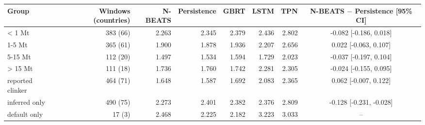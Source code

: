 \begin{tabular}{@{}lrrrrrrc@{}}
\toprule
Group & Windows (countries) & N-BEATS & Persistence & GBRT & LSTM & TPN & N-BEATS $-$ Persistence [95\% CI] \\
\midrule
< 1 Mt & 383 (66) & 2.263 & 2.345 & 2.379 & 2.436 & 2.802 & -0.082 [-0.186, 0.018] \\
1-5 Mt & 365 (61) & 1.900 & 1.878 & 1.936 & 2.207 & 2.656 & 0.022 [-0.063, 0.107] \\
5-15 Mt & 112 (20) & 1.497 & 1.534 & 1.594 & 1.729 & 2.023 & -0.037 [-0.197, 0.104] \\
> 15 Mt & 111 (18) & 1.736 & 1.760 & 1.742 & 2.281 & 2.305 & -0.024 [-0.155, 0.095] \\
\midrule
reported clinker & 464 (71) & 1.648 & 1.587 & 1.692 & 2.083 & 2.365 & 0.062 [-0.007, 0.122] \\
inferred only & 490 (75) & 2.273 & 2.401 & 2.382 & 2.376 & 2.809 & -0.128 [-0.231, -0.028] \\
default only & 17 (3) & 2.468 & 2.225 & 2.182 & 3.223 & 3.033 & -- \\
\bottomrule
\end{tabular}
